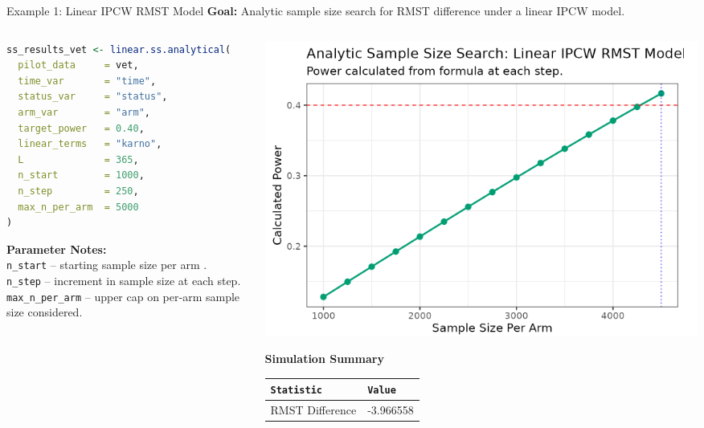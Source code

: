 \documentclass{beamer}
\begin{document}

\begin{frame}[fragile]{Example 1: Linear IPCW RMST Model}
\textbf{Goal:} Analytic sample size search for RMST difference under a linear IPCW model.

\begin{columns}[T,onlytextwidth]
  \begin{column}{0.55\textwidth}
  \scriptsize
    \begin{lstlisting}[language=R]
ss_results_vet <- linear.ss.analytical(
  pilot_data     = vet,
  time_var       = "time",
  status_var     = "status",
  arm_var        = "arm",
  target_power   = 0.40,
  linear_terms   = "karno",
  L              = 365,
  n_start        = 1000,
  n_step         = 250,
  max_n_per_arm  = 5000
)
    \end{lstlisting}
    {\scriptsize
    \textbf{Parameter Notes:} \\
    \texttt{n\_start} – starting sample size per arm . \\
    \texttt{n\_step} – increment in sample size at each step. \\
    \texttt{max\_n\_per\_arm} – upper cap on per‑arm sample size considered. \\
    }
  \end{column}

  \begin{column}{0.45\textwidth}
    \centering
    \includegraphics[width=\linewidth]{images/Example_LIN.png}

    \vspace{0.4em}
    \footnotesize
   \textbf{Simulation Summary}

    \vspace{0.25em}
 \begin{tabular}{@{}ll@{}}
      \toprule
      \texttt{Statistic} & \texttt{Value} \\
      \midrule
       RMST Difference  & -3.966558 \\
      \bottomrule
    \end{tabular}
  \end{column}
\end{columns}
\end{frame}
\end{document}
